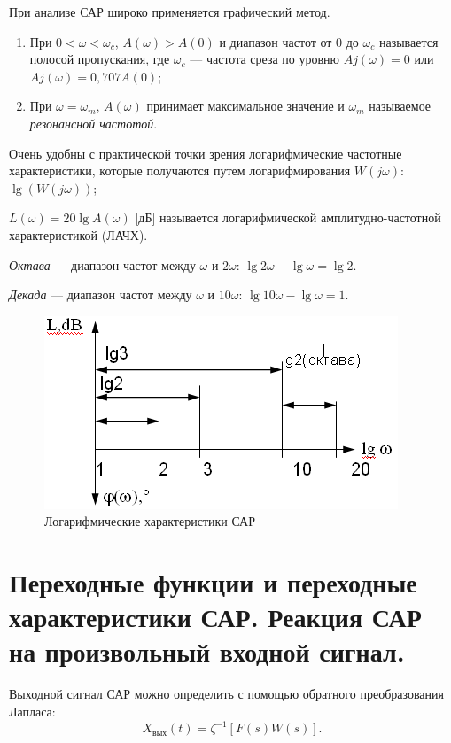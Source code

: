 \documentclass[unicode, 12pt, a4paper, oneside]{article}
\begin{document}
При анализе САР широко применяется графический метод.
\begin{enumerate}
\item При $ 0 < \omega < \omega_c $, $ A(\omega) > A(0) $ и диапазон частот от 0 до $ \omega_c $ называется  полосой пропускания, где $ \omega_c $ --- частота среза по уровню $ Aj(\omega) = 0 $ или $ Aj(\omega) = 0,707 A(0) $;
\item При $ \omega = \omega_m  $, $ A(\omega) $ принимает максимальное значение и $ \omega_m $ называемое \textit{резонансной частотой}.
\end{enumerate}

Очень удобны с практической точки зрения логарифмические частотные характеристики, которые получаются путем логарифмирования $ W(j\omega) $: $ \lg(W(j\omega)) $;

$ L(\omega) = 20\lg A(\omega) $ [дБ] называется логарифмической амплитудно-частотной характеристикой (ЛАЧХ).

\textit{Октава} --- диапазон частот между  $ \omega $ и  $ 2\omega $: $ \lg 2\omega - \lg \omega = \lg 2 $.

\textit{Декада} --- диапазон частот между $ \omega $  и  $ 10\omega $:  $ \lg 10\omega - \lg\omega = 1 $.

\begin{figure}[H]
\centering
\includegraphics[width=0.5\linewidth]{23_lchars.png}
\caption{Логарифмические характеристики САР}
\end{figure}


\section{Переходные функции и переходные характеристики САР. Реакция САР на произвольный входной сигнал.}

Выходной сигнал САР можно определить с помощью обратного преобразования Лапласа:
\begin{equation}
X_\text{вых}(t) = \zeta^{-1}[F(s)W(s)].
\end{equation}
\end{document}
